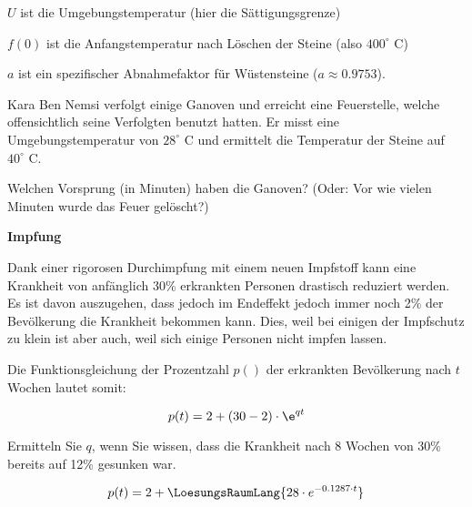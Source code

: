 $U$ ist die Umgebungstemperatur (hier die Sättigungsgrenze)

$f(0)$ ist die Anfangstemperatur nach Löschen der Steine (also $400^\circ$ C)

$a$ ist ein spezifischer Abnahmefaktor für Wüstensteine ($a\approx 0.9753$).


Kara Ben Nemsi verfolgt einige Ganoven und erreicht eine Feuerstelle, welche offensichtlich seine Verfolgten benutzt hatten. Er misst eine Umgebungstemperatur von $28^\circ$ C und ermittelt die Temperatur der Steine auf $40^\circ$ C.

Welchen Vorsprung (in Minuten) haben die Ganoven? (Oder: Vor wie vielen Minuten wurde das Feuer gelöscht?)


\platzFuerBerechnungenBisEndeSeite{}



\bbwActAufgabenNr{} \textbf{Impfung}
\nextBbwAufgabenNummer{}

Dank einer rigorosen Durchimpfung mit einem neuen Impfstoff kann eine Krankheit von anfänglich 30\% erkrankten Personen
drastisch reduziert werden. Es ist davon auszugehen, dass jedoch im
Endeffekt jedoch immer noch 2\% der Bevölkerung die Krankheit bekommen
kann. Dies, weil bei einigen der Impfschutz zu klein ist aber auch,
weil sich einige Personen nicht impfen lassen.

Die Funktionsgleichung der Prozentzahl $p()$ der erkrankten Bevölkerung nach $t$ Wochen lautet somit:

$$p(t) = 2 + (30-2)\cdot \e^{qt}$$

Ermitteln Sie $q$, wenn Sie wissen, dass die Krankheit nach 8 Wochen von 30\% bereits auf 12\% gesunken war.

$$p(t) = 2 + \LoesungsRaumLang{28\cdot{}e^{-0.1287\cdot{}t}}$$


\platzFuerBerechnungenBisEndeSeite{}



